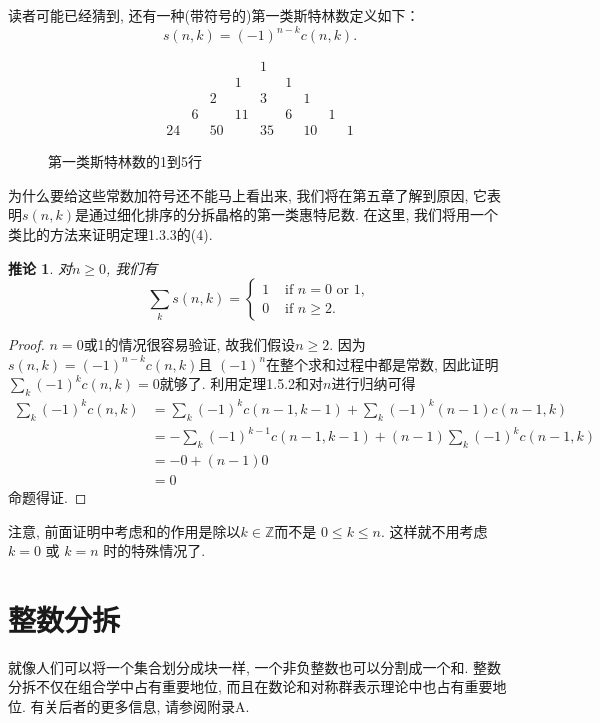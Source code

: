 \documentclass{ctexbook}
\newtheorem{cor}[thm]{推论}
\begin{document}
读者可能已经猜到, 还有一种(带符号的)第一类斯特林数定义如下：
$$
s(n, k)=(-1)^{n-k} c(n, k).
$$


\begin{figure}
    \centering
   $$\begin{array}{ccccccccccccc}
       & & & & 1 & & & & \\
       & & & 1 & & 1 & & & \\
       & & 2 & & 3 & & 1 & & \\
       & 6 & & 11 & & 6 & & 1 & \\
       24 & & 50 & & 35 & & 10 & & 1
   \end{array}$$
    \caption{  第一类斯特林数的1到5行}
\end{figure}



为什么要给这些常数加符号还不能马上看出来, 我们将在第五章了解到原因, 它表明$s(n, k)$是通过细化排序的分拆晶格的第一类惠特尼数.
在这里, 我们将用一个类比的方法来证明定理1.3.3的(4).
  \begin{cor}
  	对$n \geqslant 0$, 我们有
  	$$
  	\sum_{k} s(n, k)=\left\{\begin{array}{ll}
  	1 & \text { if } n=0 \text { or } 1, \\
  	0 & \text { if } n \geqslant 2.
  	\end{array}\right.
  	$$
  \end{cor}
   \begin{proof}
   	$n=0$或1的情况很容易验证, 故我们假设$n \geqslant 2 $. 因为$s(n, k)=(-1)^{n-k} c(n, k)$且 $(-1)^{n}$在整个求和过程中都是常数,
   	因此证明$\sum_{k}(-1)^{k} c(n, k)=0 $就够了. 利用定理1.5.2和对$n$进行归纳可得
   	$$
   	\begin{aligned}
   	\sum_{k}(-1)^{k} c(n, k) &=\sum_{k}(-1)^{k} c(n-1, k-1)+\sum_{k}(-1)^{k}(n-1) c(n-1, k) \\
   	&=-\sum_{k}(-1)^{k-1} c(n-1, k-1)+(n-1) \sum_{k}(-1)^{k} c(n-1, k) \\
   	&=-0+(n-1) 0 \\
   	&=0
   	\end{aligned}
   	$$
   	命题得证.
   \end{proof}

注意, 前面证明中考虑和的作用是除以$k \in \mathbb{Z}$而不是 $0 \leqslant k \leqslant n $. 这样就不用考虑$k=0$ 或 $k=n$
时的特殊情况了.

\section{整数分拆}
就像人们可以将一个集合划分成块一样, 一个非负整数也可以分割成一个和. 整数分拆不仅在组合学中占有重要地位, 而且在数论和对称群表示理论中也占有重要地位.
有关后者的更多信息, 请参阅附录A.
\end{document}
